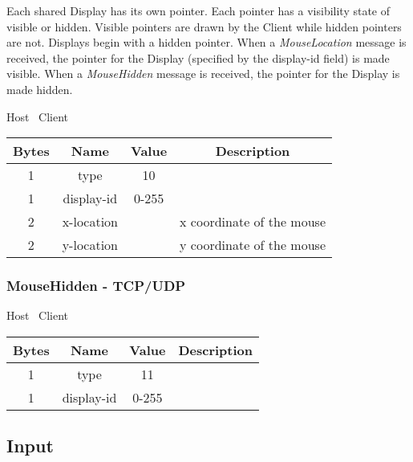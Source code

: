 Each shared Display has its own pointer.
Each pointer has a visibility state of visible or hidden.
Visible pointers are drawn by the Client while hidden pointers are not.
Displays begin with a hidden pointer.
When a \emph{MouseLocation} message is received, the pointer for the Display (specified by the display-id field) is made visible.
When a \emph{MouseHidden} message is received, the pointer for the Display is made hidden.

\begin{center}
    Host \textrightarrow\ Client\\
    \begin{tabular}{|c|c|c|c|}
        \hline
        \textbf{Bytes} & \textbf{Name} & \textbf{Value} & \textbf{Description}      \\
        \hline
        1              & type          & 10              &                           \\
        \hline
        1              & display-id    & 0-255          &                           \\
        \hline
        2              & x-location    &                & x coordinate of the mouse \\
        \hline
        2              & y-location    &                & y coordinate of the mouse \\
        \hline
    \end{tabular}
\end{center}

\subsubsection{MouseHidden - TCP/UDP}

\begin{center}
    Host \textrightarrow\ Client\\
    \begin{tabular}{|c|c|c|c|}
        \hline
        \textbf{Bytes} & \textbf{Name} & \textbf{Value} & \textbf{Description} \\
        \hline
        1              & type          & 11              &                      \\
        \hline
        1              & display-id    & 0-255          &                      \\
        \hline
    \end{tabular}
\end{center}

\subsection{Input}

